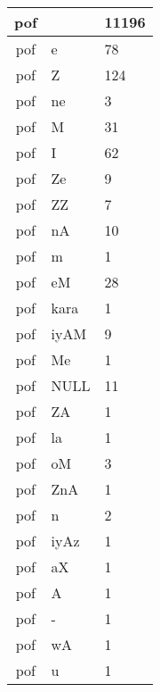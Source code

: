 \documentclass[a4 paper]{article}
\begin{document}
\begin{longtable}{cp{}p{}}
pof &  & 11196\\ \midrule pof & e & 78\\ \midrule pof & Z & 124\\ \midrule pof & ne & 3\\ \midrule pof & M & 31\\ \midrule pof & I & 62\\ \midrule pof & Ze & 9\\ \midrule pof & ZZ & 7\\ \midrule pof & nA & 10\\ \midrule pof & m & 1\\ \midrule pof & eM & 28\\ \midrule pof & kara & 1\\ \midrule pof & iyAM & 9\\ \midrule pof & Me & 1\\ \midrule pof & NULL & 11\\ \midrule pof & ZA & 1\\ \midrule pof & la & 1\\ \midrule pof & oM & 3\\ \midrule pof & ZnA & 1\\ \midrule pof & n & 2\\ \midrule pof & iyAz & 1\\ \midrule pof & aX & 1\\ \midrule pof & A & 1\\ \midrule pof & - & 1\\ \midrule pof & wA & 1\\ \midrule pof & u & 1\\ \midrule 

\end{longtable}
\end{document}
